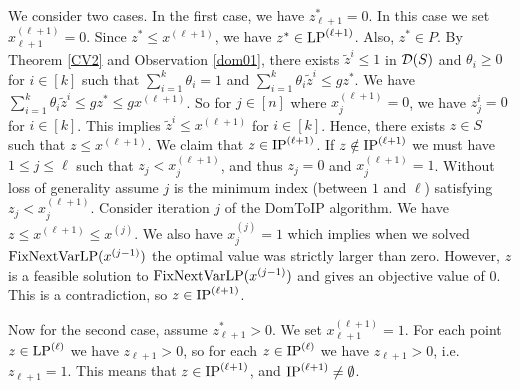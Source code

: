 We consider two cases. In the first case, we have $z^*_{\ell+1}=0$. In this case we set $x^{(\ell+1)}_{\ell+1}=0$. Since $z^*\leq x^{(\ell+1)}$, we have $z^*\in \operatorname{LP}^{(\ell+1)}$. Also, $z^*\in P$. By Theorem \ref{CV2} and Observation \ref{dom01}, there exists $\tilde{z}^i\leq 1$ in $\operatorname{\mathcal{D}}(S)$ and $\theta_i\geq 0$ for $i\in [k]$ such that $\sum_{i=1}^{k} \theta_i = 1$ and  $\sum_{i=1}^{k}\theta_i \tilde{z}^i \leq gz^*$. We have $\sum_{i=1}^{k}\theta_i \tilde{z}^i \leq gz^*\leq gx^{(\ell+1)}$.
So for $j\in [n]$ where $x^{(\ell+1)}_j=0$, we have $z^i_j=0$ for $i\in [k]$. This implies $\tilde{z}^i\leq x^{(\ell+1)}$ for $i\in [k]$. Hence, there exists $z\in S$ such that $z\leq x^{(\ell+1)}$. We claim that $z\in \operatorname{IP}^{(\ell+1)}$. If $z\notin \operatorname{IP}^{(\ell+1)}$ we must have $1\leq j \leq \ell$ such that $z_j < x^{(\ell+1)}_{j}$, and thus $z_j = 0$ and $x^{(\ell+1)}_j=1$. Without loss of generality assume $j$ is the minimum index (between $1$ and $\ell$) satisfying $z_j < x^{(\ell+1)}_{j}$. Consider iteration $j$ of the DomToIP algorithm. We have $z\leq x^{(\ell+1)}\leq x^{(j)}$.
We also have $x^{(j)}_j=1$ which implies when we solved $\operatorname{{{FixNextVarLP}}}(x^{(j-1)})$ the optimal value was strictly larger than zero. However, $z$ is a feasible solution to $\operatorname{{{FixNextVarLP}}}(x^{(j-1)})$ and gives an objective value of 0. This is a contradiction, so $z\in \operatorname{IP}^{(\ell+1)}$.

Now for the second case, assume $z^*_{\ell+1} > 0$. We set $x^{(\ell+1)}_{\ell+1}=1$. For each point $z\in \operatorname{LP}^{(\ell)}$ we have $z_{\ell+1} >0$, so for each $z\in \operatorname{IP}^{(\ell)}$ we have $z_{\ell+1}>0$, i.e. $z_{\ell+1}=1$. This means that $z\in \operatorname{IP}^{(\ell+1)}$, and $\operatorname{IP}^{(\ell+1)} \neq \emptyset$.

